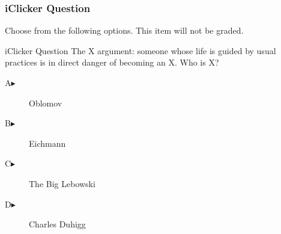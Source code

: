 \begin{frame}
  \frametitle{iClicker Question}
Choose from the following options. This item will not be graded.
\begin{block}{iClicker Question}
The X argument: someone whose life is guided by usual practices is in
direct danger of becoming an X. Who is X?
\end{block}
\begin{description}
\item[A\hspace{.2in}$\blacktriangleright$] Oblomov
\item[B\hspace{.2in}$\blacktriangleright$] Eichmann
\item[C\hspace{.2in}$\blacktriangleright$] The Big Lebowski
\item[D\hspace{.2in}$\blacktriangleright$] Charles Duhigg
\end{description}
\end{frame}
